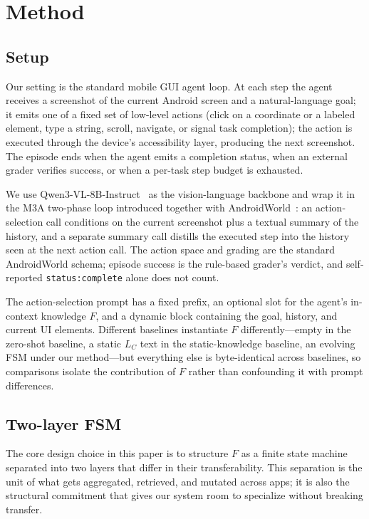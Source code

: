 \section{Method}
\label{sec:method}

\subsection{Setup}
\label{sec:method-setup}

Our setting is the standard mobile GUI agent loop. At each step the agent receives a screenshot of the current Android screen and a natural-language goal; it emits one of a fixed set of low-level actions (click on a coordinate or a labeled element, type a string, scroll, navigate, or signal task completion); the action is executed through the device's accessibility layer, producing the next screenshot. The episode ends when the agent emits a completion status, when an external grader verifies success, or when a per-task step budget is exhausted.

We use Qwen3-VL-8B-Instruct~\citep{qwen3vl2025} as the vision-language backbone and wrap it in the M3A two-phase loop introduced together with AndroidWorld~\citep{rawles2024androidworld}: an action-selection call conditions on the current screenshot plus a textual summary of the history, and a separate summary call distills the executed step into the history seen at the next action call. The action space and grading are the standard AndroidWorld schema; episode success is the rule-based grader's verdict, and self-reported \texttt{status:complete} alone does not count.

The action-selection prompt has a fixed prefix, an optional slot for the agent's in-context knowledge $F$, and a dynamic block containing the goal, history, and current UI elements. Different baselines instantiate $F$ differently---empty in the zero-shot baseline, a static $L_C$ text in the static-knowledge baseline, an evolving FSM under our method---but everything else is byte-identical across baselines, so comparisons isolate the contribution of $F$ rather than confounding it with prompt differences.

\subsection{Two-layer FSM}
\label{sec:method-fsm}

The core design choice in this paper is to structure $F$ as a finite state machine separated into two layers that differ in their transferability. This separation is the unit of what gets aggregated, retrieved, and mutated across apps; it is also the structural commitment that gives our system room to specialize without breaking transfer.


